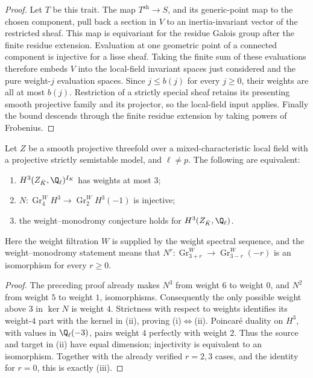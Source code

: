 \begin{proof}
Let $T$ be this trait.  The map $T^{\mathrm{sh}}\to S$, and its
generic-point map to the chosen component, pull back a section in
$V$ to an inertia-invariant vector of the restricted sheaf.
This map is equivariant for the residue Galois group after the
finite residue extension.  Evaluation at one geometric point of
a connected component is injective for a lisse sheaf.  Taking
the finite sum of these evaluations therefore embeds $V$ into
the local-field invariant spaces just considered and the pure
weight-$j$ evaluation spaces.  Since $j\leq b(j)$ for every
$j\geq0$, their weights are all at most $b(j)$.
Restriction of a strictly special sheaf retains its presenting
smooth projective family and its projector, so the local-field
input applies.  Finally the bound descends through the finite
residue extension by taking powers of Frobenius.
\end{proof}

\begin{corollary}
\label{c:threefold-weight-gate}
Let $Z$ be a smooth projective threefold over a mixed-characteristic
local field with a projective strictly semistable model, and
$\ell\ne p$.  The following are equivalent:
\begin{enumerate}[label=(\roman*)]
\item $H^3(Z_{\bar K},\Q_\ell)^{I_K}$ has weights at most $3$;
\item $N:\operatorname{Gr}^W_4H^3\to
       \operatorname{Gr}^W_2H^3(-1)$ is injective;
\item the weight--monodromy conjecture holds for $H^3(Z_{\bar K},\Q_\ell)$.
\end{enumerate}
Here the weight filtration $W$ is supplied by the weight spectral
sequence, and the weight--monodromy statement means that
$N^r:\operatorname{Gr}^W_{3+r}\to
\operatorname{Gr}^W_{3-r}(-r)$ is an isomorphism for every $r\geq0$.
\end{corollary}

\begin{proof}
The preceding proof already makes $N^3$ from weight $6$ to weight
$0$, and $N^2$ from weight $5$ to weight $1$, isomorphisms.
Consequently the only possible weight above $3$ in $\ker N$ is
weight $4$.  Strictness with respect to weights identifies its
weight-$4$ part with the kernel in (ii), proving (i)$\Leftrightarrow$(ii).
Poincar\'e duality on $H^3$, with values in $\Q_\ell(-3)$, pairs
weight $4$ perfectly with weight $2$.  Thus the source and target
in (ii) have equal dimension; injectivity is equivalent to an
isomorphism.  Together with the already verified $r=2,3$ cases,
and the identity for $r=0$, this is exactly (iii).
\end{proof}

